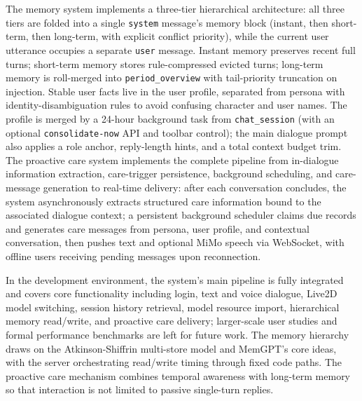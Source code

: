 \documentclass{base}
\begin{document}
\begin{enabstract}
    The memory system implements a three-tier hierarchical architecture: all three tiers are folded into a single \texttt{system} message's memory block (instant, then short-term, then long-term, with explicit conflict priority), while the current user utterance occupies a separate \texttt{user} message. Instant memory preserves recent full turns; short-term memory stores rule-compressed evicted turns; long-term memory is roll-merged into \texttt{period\_overview} with tail-priority truncation on injection. Stable user facts live in the user profile, separated from persona with identity-disambiguation rules to avoid confusing character and user names. The profile is merged by a 24-hour background task from \texttt{chat\_session} (with an optional \texttt{consolidate-now} API and toolbar control); the main dialogue prompt also applies a role anchor, reply-length hints, and a total context budget trim. The proactive care system implements the complete pipeline from in-dialogue information extraction, care-trigger persistence, background scheduling, and care-message generation to real-time delivery: after each conversation concludes, the system asynchronously extracts structured care information bound to the associated dialogue context; a persistent background scheduler claims due records and generates care messages from persona, user profile, and contextual conversation, then pushes text and optional MiMo speech via WebSocket, with offline users receiving pending messages upon reconnection.

    In the development environment, the system's main pipeline is fully integrated and covers core functionality including login, text and voice dialogue, Live2D model switching, session history retrieval, model resource import, hierarchical memory read/write, and proactive care delivery; larger-scale user studies and formal performance benchmarks are left for future work. The memory hierarchy draws on the Atkinson-Shiffrin multi-store model and MemGPT's core ideas, with the server orchestrating read/write timing through fixed code paths. The proactive care mechanism combines temporal awareness with long-term memory so that interaction is not limited to passive single-turn replies.

\end{enabstract}

\clearpage
\mainbodytrue
{}
\pagestyle{mainstyle}
\end{document}
